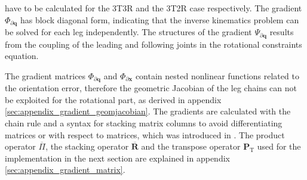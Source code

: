 \documentclass[robotics,article,submit,moreauthors,pdftex]{Definitions/mdpi}
\newcommand{\bm}[1]{\boldsymbol{#1}}
\newcommand{\transp}[0]{{\mathrm{T}}}
\let\Phi\varPhi
\let\Psi\varPsi
\begin{document}
%
have to be calculated for the 3T3R and the 3T2R case respectively.
The gradient $\bm{\Phi}_{\partial \bm{q}}$ has block diagonal form, indicating that the inverse kinematics problem can be solved for each leg independently.
The structures of the gradient $\bm{\Psi}_{\partial \bm{q}}$ results from the coupling of the leading and following joints in the rotational constraints equation.

The gradient matrices $\bm{\Phi}_{\partial \bm{q}}$ and $\bm{\Phi}_{\partial \bm{x}}$ contain nested nonlinear functions related to the orientation error, therefore the geometric Jacobian of the leg chains can not be exploited for the rotational part, as derived in appendix\,\ref{sec:appendix_gradient_geomjacobian}.
The gradients are calculated with the chain rule and a syntax for stacking matrix columns to avoid differentiating matrices or with respect to matrices, which was introduced in \cite{1_SchapplerTapOrt2019}.
The product operator $\overline{\Pi}$, the stacking operator $\overline{\bm{R}}$ and the transpose operator $\bm{P}_\transp$ used for the implementation in the next section are explained in appendix\,\ref{sec:appendix_gradient_matrix}.
\end{document}
